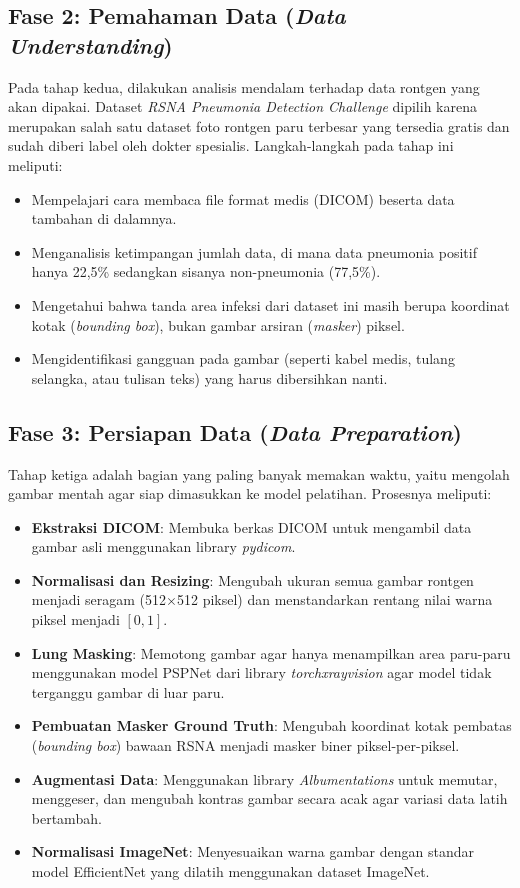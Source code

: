 \documentclass[12pt,a4paper,oneside]{book}
\begin{document}
\subsection{Fase 2: Pemahaman Data (\textit{Data Understanding})}

Pada tahap kedua, dilakukan analisis mendalam terhadap data rontgen yang akan dipakai. Dataset \textit{RSNA Pneumonia Detection Challenge} dipilih karena merupakan salah satu dataset foto rontgen paru terbesar yang tersedia gratis dan sudah diberi label oleh dokter spesialis. Langkah-langkah pada tahap ini meliputi:
\begin{itemize}
  \item Mempelajari cara membaca file format medis (DICOM) beserta data tambahan di dalamnya.
  \item Menganalisis ketimpangan jumlah data, di mana data pneumonia positif hanya 22,5\% sedangkan sisanya non-pneumonia (77,5\%).
  \item Mengetahui bahwa tanda area infeksi dari dataset ini masih berupa koordinat kotak (\textit{bounding box}), bukan gambar arsiran (\textit{masker}) piksel.
  \item Mengidentifikasi gangguan pada gambar (seperti kabel medis, tulang selangka, atau tulisan teks) yang harus dibersihkan nanti.
\end{itemize}

\subsection{Fase 3: Persiapan Data (\textit{Data Preparation})}

Tahap ketiga adalah bagian yang paling banyak memakan waktu, yaitu mengolah gambar mentah agar siap dimasukkan ke model pelatihan. Prosesnya meliputi:
\begin{itemize}
  \item \textbf{Ekstraksi DICOM}: Membuka berkas DICOM untuk mengambil data gambar asli menggunakan library \textit{pydicom}.
  \item \textbf{Normalisasi dan Resizing}: Mengubah ukuran semua gambar rontgen menjadi seragam (512$\times$512 piksel) dan menstandarkan rentang nilai warna piksel menjadi $[0, 1]$.
  \item \textbf{Lung Masking}: Memotong gambar agar hanya menampilkan area paru-paru menggunakan model PSPNet dari library \textit{torchxrayvision} agar model tidak terganggu gambar di luar paru.
  \item \textbf{Pembuatan Masker Ground Truth}: Mengubah koordinat kotak pembatas (\textit{bounding box}) bawaan RSNA menjadi masker biner piksel-per-piksel.
  \item \textbf{Augmentasi Data}: Menggunakan library \textit{Albumentations} untuk memutar, menggeser, dan mengubah kontras gambar secara acak agar variasi data latih bertambah.
  \item \textbf{Normalisasi ImageNet}: Menyesuaikan warna gambar dengan standar model EfficientNet yang dilatih menggunakan dataset ImageNet.
\end{itemize}
\end{document}
